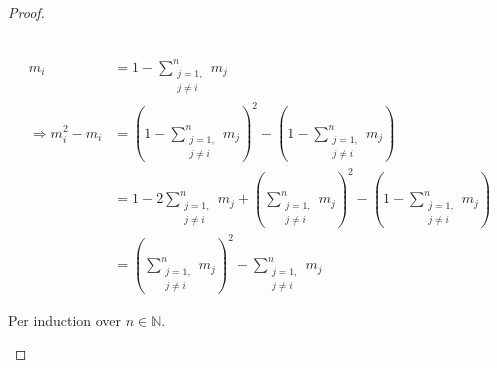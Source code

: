 \begin{proof}[Proof\nopunct]
\begin{subproof}
\phantom{}\\
\begin{align}
m_{i} &= 1 - \sum_{\begin{smallmatrix}j=1,\\ j \neq i\end{smallmatrix}}^{n} m_{j} \\
\Rightarrow m_{i}^{2} - m_{i} &= (1 - \sum_{\begin{smallmatrix}j=1,\\ j \neq i\end{smallmatrix}}^{n} m_{j})^{2}
 - (1 - \sum_{\begin{smallmatrix}j=1,\\ j \neq i\end{smallmatrix}}^{n} m_{j}) \\
 &= 1 - 2\sum_{\begin{smallmatrix}j=1,\\ j \neq i\end{smallmatrix}}^{n} m_{j}
 + (\sum_{\begin{smallmatrix}j=1,\\ j \neq i\end{smallmatrix}}^{n} m_{j})^{2}
 - (1 - \sum_{\begin{smallmatrix}j=1,\\ j \neq i\end{smallmatrix}}^{n} m_{j}) \\
 &= (\sum_{\begin{smallmatrix}j=1,\\ j \neq i\end{smallmatrix}}^{n} m_{j})^{2}
 - \sum_{\begin{smallmatrix}j=1,\\ j \neq i\end{smallmatrix}}^{n} m_{j}
\end{align}

Per induction over $n\in \mathbb{N}$.


\end{subproof}
\end{proof}
